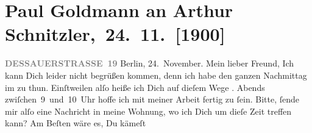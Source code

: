 

         
         \renewcommand{\erwaehntePersonen}{Personen: Moritz Coschell, Marie Glümer, Paul Goldmann, Alfred Kerr, Paul Martin Marton}
         \renewcommand{\erwaehnteOrte}{Orte: Berlin, Dessauer Straße, Hotel Kaiserhof, Reichstag}
         \renewcommand{\erwaehnteWerke}{}
               \section[ Paul Goldmann an Arthur Schnitzler, 24. 11. {[}1900{]}]{ Paul Goldmann an Arthur Schnitzler, 24. 11. {[}1900{]}}\nopagebreak{}\rehead{ }\begin{ledgroupsized}[t]{13cm}\normalsize\beginnumbering{} \toendnotes[C]{\smallbreak\pagebreak[2]} 
\toendnotes[C]{\smallbreak}\pstart
           \noindent{}\raggedleft{}{\pb}\textcolor{gray}{\textbf{DESSAUERSTRASSE 19}}\pend
           \pstart
           Berlin, 24. November.\pend
           \pstart\center{}Mein lieber Freund,\pend\pstart
           Ich kann Dich leider nicht begrüßen kommen, denn ich habe den ganzen Nachmittag im
                  \label{K_L02940-1v}\label{K_L02940-1h} zu thun. Einſtweilen alſo heiße ich Dich auf dieſem Wege \label{K_L02940-2v}\label{K_L02940-2h}. Abends
                  zwiſchen 9 und 10 Uhr hoffe ich mit meiner Arbeit fertig zu ſein. Bitte,
               ſende mir alſo eine Nachricht in meine Wohnung, wo ich Dich um dieſe Zeit treffen {\pb}kann? Am Beſten wäre es, Du kämeſt

\end{ledgroupsized}

